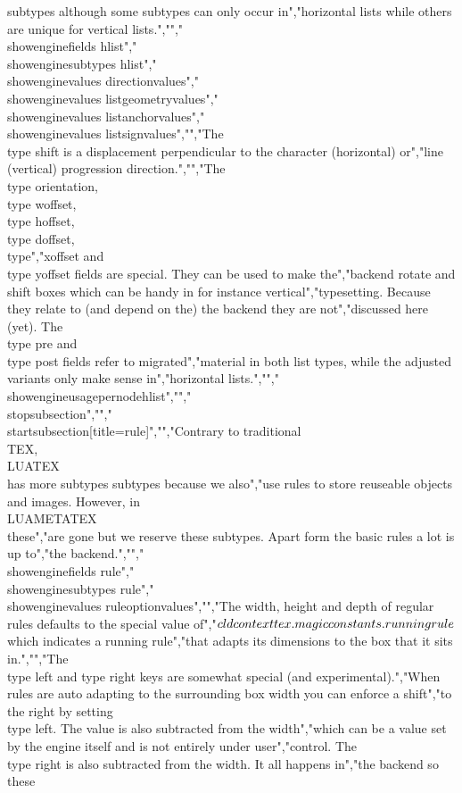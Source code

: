 subtypes although some subtypes can only occur in","horizontal lists while others are unique for vertical lists.","","\\showenginefields   {hlist}","\\showenginesubtypes {hlist}","\\showenginevalues   {directionvalues}","\\showenginevalues   {listgeometryvalues}","\\showenginevalues   {listanchorvalues}","\\showenginevalues   {listsignvalues}","","The \\type {shift} is a displacement perpendicular to the character (horizontal) or","line (vertical) progression direction.","","The \\type {orientation}, \\type {woffset}, \\type {hoffset}, \\type {doffset}, \\type","{xoffset} and \\type {yoffset} fields are special. They can be used to make the","backend rotate and shift boxes which can be handy in for instance vertical","typesetting. Because they relate to (and depend on the) the backend they are not","discussed here (yet). The \\type {pre} and \\type {post} fields refer to migrated","material in both list types, while the adjusted variants only make sense in","horizontal lists.","","\\showengineusagepernode{hlist}","","\\stopsubsection","","\\startsubsection[title={rule}]","","Contrary to traditional \\TEX, \\LUATEX\\ has more subtypes subtypes because we also","use rules to store reuseable objects and images. However, in \\LUAMETATEX\\ these","are gone but we reserve these subtypes. Apart form the basic rules a lot is up to","the backend.","","\\showenginefields   {rule}","\\showenginesubtypes {rule}","\\showenginevalues   {ruleoptionvalues}","","The width, height and depth of regular rules defaults to the special value of","$\\cldcontext {tex . magicconstants . runningrule}$ which indicates a running rule","that adapts its dimensions to the box that it sits in.","","The \\type {left} and type {right} keys are somewhat special (and experimental).","When rules are auto adapting to the surrounding box width you can enforce a shift","to the right by setting \\type {left}. The value is also subtracted from the width","which can be a value set by the engine itself and is not entirely under user","control. The \\type {right} is also subtracted from the width. It all happens in","the backend so these 
